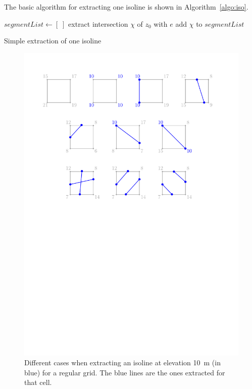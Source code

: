 %

The basic algorithm for extracting one isoline is shown in Algorithm~\ref{algo:iso}.
\begin{algorithm}[tb] 
  $segmentList \leftarrow [\;]$ \;
  {
    {
      extract intersection $\chi$ of $z_0$ with $e$\;
      add $\chi$ to $segmentList$\;
    }
  }
  \caption{Simple extraction of one isoline}%
\label{algo:iso}
\end{algorithm} 
\begin{figure}
  \centering
  \includegraphics[width=0.95\linewidth]{figs/isoline-square}
\caption{Different cases when extracting an isoline at elevation \qty{10}{\m} (in blue) for a regular grid. The blue lines are the ones extracted for that cell.}%
\label{fig:rasterconfs}
\end{figure}
